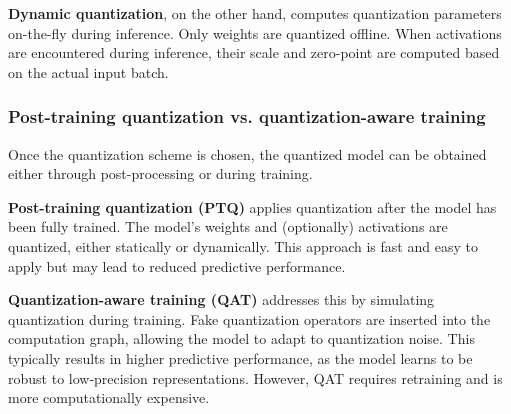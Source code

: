 \textbf{Dynamic quantization}, on the other hand, computes quantization parameters on-the-fly during inference. Only weights are quantized offline. When activations are encountered during inference, their scale and zero-point are computed based on the actual input batch.

\subsubsection*{Post-training quantization vs. quantization-aware training}

Once the quantization scheme is chosen, the quantized model can be obtained either through post-processing or during training.

\textbf{Post-training quantization (PTQ)} applies quantization after the model has been fully trained. The model's weights and (optionally) activations are quantized, either statically or dynamically. This approach is fast and easy to apply but may lead to reduced predictive performance.

\textbf{Quantization-aware training (QAT)} addresses this by simulating quantization during training. Fake quantization operators are inserted into the computation graph, allowing the model to adapt to quantization noise. This typically results in higher predictive performance, as the model learns to be robust to low-precision representations. However, QAT requires retraining and is more computationally expensive.